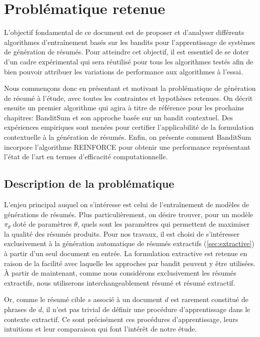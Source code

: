 \chapter{Problématique retenue}
\label{chap:bandit_contextuel}

L'objectif fondamental de ce document est de proposer et 
d'analyser différents algorithmes d'entraînement basés 
sur les bandits pour l'apprentissage de systèmes de génération 
de résumés.
Pour atteindre cet objectif, il est essentiel de se doter 
d'un cadre expérimental qui sera réutilisé pour tous les algorithmes
testés afin de bien pouvoir attribuer les variations de performance 
aux algorithmes à l'essai.

Nous commençons donc en présentant et motivant 
la problématique de génération de résumé à l'étude, avec toutes 
les contraintes et hypothèses retenues.
On décrit ensuite un premier algorithme qui agira
à titre de référence pour les prochains chapitres:
BanditSum \citep{dong2018banditsum} et son approche basée sur 
un bandit contextuel.
Des expériences empiriques sont menées pour certifier 
l'applicabilité de la formulation contextuelle à la génération 
de résumés.
Enfin, on présente comment BanditSum incorpore l'algorithme 
REINFORCE \citep{williams1992simple} 
pour obtenir une performance représentant l'état de l'art
en termes d'efficacité computationnelle.

\section{Description de la problématique}
\label{section:problematique}

L'enjeu principal auquel on s'intéresse est celui de 
l'entraînement de modèles de générations de résumés.
Plus particulièrement, on désire trouver, pour un modèle 
$\pi_\theta$ doté de paramètres $\theta$, quels sont 
les paramètres qui permettent de maximiser la qualité des 
résumés produits.
Pour nos travaux, il est choisi de s'intéresser exclusivement
à la génération automatique de résumés extractifs (\ref{sec:extractive}) à partir 
d'un seul document en entrée.
La formulation extractive est retenue en raison de la facilité avec
laquelle les approches par bandit peuvent y être utilisées.
À partir de maintenant, comme nous considérons exclusivement les 
résumés extractifs, nous utiliserons interchangeablement résumé
 et résumé extractif.

Or, comme le résumé cible $s$ associé à un document $d$ est 
rarement constitué de phrases de $d$, il n'est pas trivial 
de définir une procédure d'apprentissage dans le contexte extractif.
Ce sont précisément ces procédures d'apprentissage, leurs intuitions
et leur comparaison qui font l'intérêt de notre étude.

